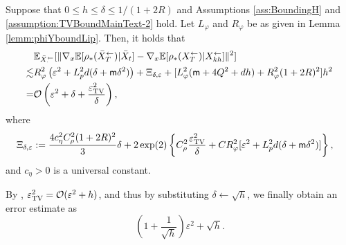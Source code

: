 \begin{thm}\label{thm:delhDiffXYExp}
Suppose that $0 \leq h \leq \delta \leq 1/(1 + 2R)$
and Assumptions \ref{ass:BoundingH} and \ref{assumption:TVBoundMainText-2} hold. 
Let $L_\varphi$ and $R_\varphi$ be as given in Lemma \ref{lemm:phiYboundLip}.
Then, it holds that  
\begin{align}
& \E_{\bar{X}_{\cdot}^\leftarrow}[ \|\nabla_x \E[\rho_*(\bar{X}_{T}^\leftarrow) |  \bar{X}_{t}] %
-  \nabla_x \E[\rho_*({X}_{T}^\leftarrow) | {X}_{kh}^\leftarrow]
\|^2]  \\
\lesssim & 
R_\varphi^2 \left(\varepsilon^2+ \Lipdp^2 d(\delta + \mathsf{m} \delta^2) \right)
+ \Xi_{\delta,\varepsilon}
+
[ L_\varphi^2 (\mathsf{m} + 4Q^2 + d h)  
+ R_\varphi^2  (1 + 2R)^2] h^2 \\
= & \gO\left(\varepsilon^2 + \delta + \frac{\varepsilon_\TV^2}{\delta}\right), 
\end{align}
where 
\begin{align}
\Xi_{\delta,\varepsilon} & := \frac{4 c_\eta^2  C_\rho^2 (1+2R)^2}{3}\delta  
+ 2 \exp(2)
\left\{ C_\rho^2 \frac{\varepsilon_{\mathrm{TV}}^2}{\delta} + C R_\varphi^2  [\varepsilon^2 + L_p^2 d(\delta + \mathsf{m} \delta^2)]\right\},
\end{align} 
and $c_\eta > 0$ is a universal constant. 
\end{thm}
By \cite{chen2023sampling}, $\varepsilon_{\mathrm{TV}}^2 = {\mathcal{O}}(\varepsilon^2 + h)$, and thus by substituting $\delta \leftarrow \sqrt{h}$, we finally obtain an error estimate as 
$$
\left( 1 + \frac{1}{\sqrt{h}}\right) \varepsilon^2 + \sqrt{h}. 
$$
